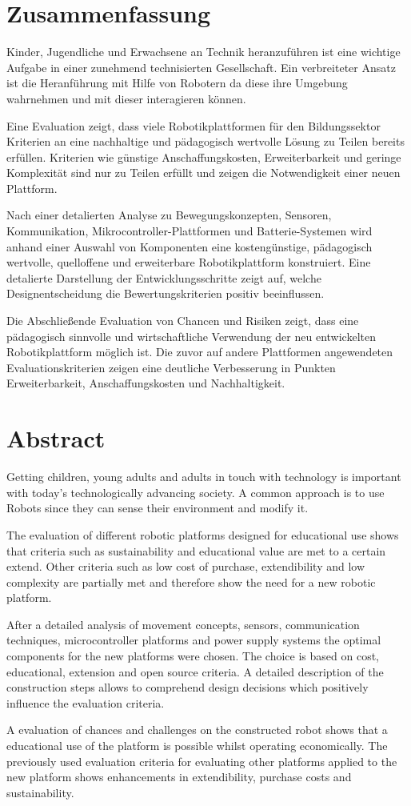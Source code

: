 \chapter*{Zusammenfassung}
Kinder, Jugendliche und Erwachsene an Technik heranzuführen ist eine wichtige Aufgabe in einer zunehmend technisierten Gesellschaft. Ein verbreiteter Ansatz ist die Heranführung mit Hilfe von Robotern da diese ihre Umgebung wahrnehmen und mit dieser interagieren können. 

Eine Evaluation zeigt, dass viele Robotikplattformen für den Bildungssektor Kriterien an eine nachhaltige und pädagogisch wertvolle Lösung zu Teilen bereits erfüllen. Kriterien wie günstige Anschaffungskosten, Erweiterbarkeit und geringe Komplexität sind nur zu Teilen erfüllt und zeigen die Notwendigkeit einer neuen Plattform.

Nach einer detalierten Analyse zu Bewegungskonzepten, Sensoren, Kommunikation, Mikrocontroller-Plattformen und Batterie-Systemen wird anhand einer Auswahl von Komponenten eine kostengünstige, pädagogisch wertvolle, quelloffene und erweiterbare Robotikplattform konstruiert. Eine detalierte Darstellung der Entwicklungsschritte zeigt auf, welche Designentscheidung die Bewertungskriterien positiv beeinflussen.

Die Abschließende Evaluation von Chancen und Risiken zeigt, dass eine pädagogisch sinnvolle und wirtschaftliche Verwendung der neu entwickelten Robotikplattform möglich ist. Die zuvor auf andere Plattformen angewendeten Evaluationskriterien zeigen eine deutliche Verbesserung in Punkten Erweiterbarkeit, Anschaffungskosten und Nachhaltigkeit.

\chapter*{Abstract}
Getting children, young adults and adults in touch with technology is important with today’s technologically advancing society. A common approach is to use Robots since they can sense their environment and modify it. 

The evaluation of different robotic platforms designed for educational use shows that criteria such as sustainability and educational value are met to a certain extend. Other criteria such as low cost of purchase, extendibility and low complexity are partially met and therefore show the need for a new robotic platform.

After a detailed analysis of movement concepts, sensors, communication techniques, microcontroller platforms and power supply systems the optimal components for the new  platforms were chosen. The choice is based on cost, educational, extension and open source criteria. A detailed description of the construction steps allows to comprehend design decisions which positively influence the evaluation criteria.

A evaluation of chances and challenges on the constructed robot shows that a educational use of the platform is possible whilst operating economically. The previously used evaluation criteria for evaluating other platforms applied to the new platform shows enhancements in extendibility, purchase costs and sustainability.

